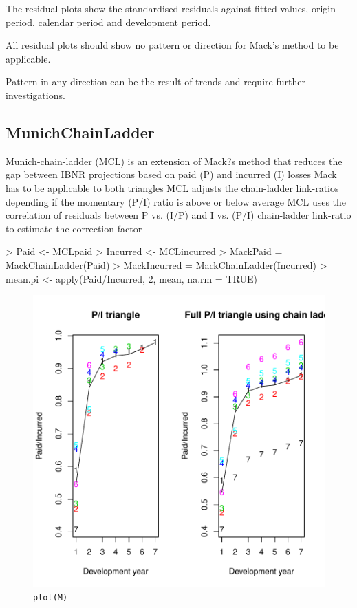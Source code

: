 \documentclass[a4paper]{article}
\begin{document}
The residual plots show the standardised residuals against fitted values, origin period, calendar period and development period.

All residual plots should show no pattern or direction for Mack's method to be applicable.

Pattern in any direction can be the result of trends and require further investigations.


\subsection{MunichChainLadder}
Munich-chain-ladder (MCL) is an extension of Mack?s method that reduces the gap between IBNR projections based on paid (P) and incurred (I) losses
Mack has to be applicable to both triangles
MCL adjusts the chain-ladder link-ratios depending if the momentary (P/I) ratio is above or below average
MCL uses the correlation of residuals between P vs. (I/P) and I vs. (P/I) chain-ladder link-ratio to estimate the correction factor
\begin{Schunk}
\begin{Sinput}
> Paid <- MCLpaid
> Incurred <- MCLincurred
> MackPaid = MackChainLadder(Paid)
> MackIncurred = MackChainLadder(Incurred)
> mean.pi <- apply(Paid/Incurred, 2, mean, na.rm = TRUE)
\end{Sinput}
\end{Schunk}
\begin{figure}[h]
  \begin{center}
\includegraphics{ChainLadder-014}
    \caption{\texttt{plot(M)}}
  \end{center}
\end{figure}
\end{document}
